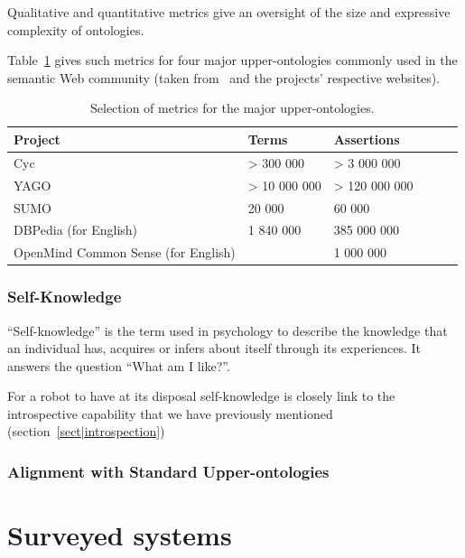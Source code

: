 \documentclass[a4paper, twocolumn]{article}
\begin{document}
Qualitative and quantitative metrics give an oversight of the size and
expressive complexity of ontologies.

Table~\ref{table|upper_onto_metrics} gives such metrics for four major
upper-ontologies commonly used in the semantic Web community (taken
from~\cite{Mascardi2007} and the projects' respective websites).


\begin{table}
\begin{center}

\begin{tabular}{llllll}
\toprule
{\bf Project} & {\bf Terms} & {\bf Assertions} \\
\midrule
Cyc & > 300 000 & > 3 000 000 & \\
YAGO & > 10 000 000 & > 120 000 000 \\
SUMO & 20 000 & 60 000 \\
DBPedia (for English) & 1 840 000 & 385 000 000\\
OpenMind Common Sense (for English) & & 1 000 000\\
\bottomrule

\end{tabular}
\end{center}
\caption{Selection of metrics for the major upper-ontologies.}
\label{table|upper_onto_metrics}
\end{table}



\subsubsection{Self-Knowledge}

``Self-knowledge'' is the term used in psychology to describe the knowledge
that an individual has, acquires or infers about itself through its
experiences. It answers the question ``What am I like?''.

For a robot to have at its disposal self-knowledge is closely link to the
introspective capability that we have previously mentioned
(section~\ref{sect|introspection})

\subsubsection{Alignment with Standard Upper-ontologies}

\section{Surveyed systems}
\label{sect|surveyed-systems}
\end{document}

